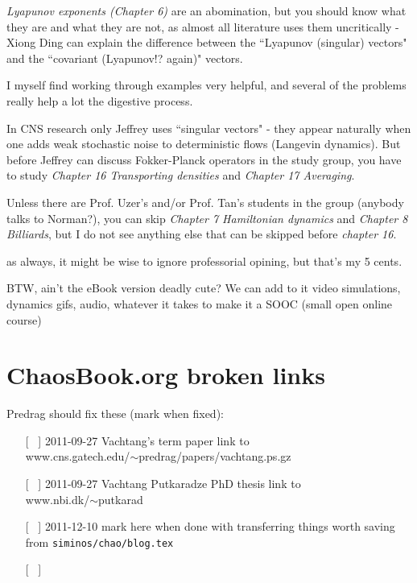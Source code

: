 \begin{description}
\emph{Lyapunov exponents (Chapter 6)} are an abomination, but you should
know what they are and what they are not, as almost  all literature
uses them uncritically - Xiong Ding can explain the difference
between the ``Lyapunov (singular) vectors" and the ``covariant
(Lyapunov!? again)" vectors.

I myself find working through examples very helpful, and several of
the problems really help a lot the digestive process.

In CNS research only Jeffrey uses ``singular vectors" - they appear
naturally when one adds weak stochastic noise to deterministic flows
(Langevin dynamics). But before Jeffrey  can discuss Fokker-Planck
operators in the study group, you have to study \emph{Chapter 16
Transporting densities} and \emph{Chapter 17 Averaging}.

Unless there are Prof. Uzer's and/or Prof. Tan's students in the
group (anybody talks to Norman?), you can skip \emph{Chapter 7 Hamiltonian
dynamics} and \emph{Chapter 8 Billiards}, but I do not see anything else that
can be skipped before \emph{chapter 16}.

as always, it might be wise to ignore professorial opining, but that's my 5 cents.

BTW, ain't the eBook version deadly cute? We can add to it video simulations, dynamics gifs, audio, whatever it takes to make it a SOOC (small open online course)

\end{description}

\section{ChaosBook.org broken links}
\label{c-brokenLinks}

Predrag should fix these (mark when fixed):
\begin{itemize}
  \item[[~]] 2011-09-27
{Vachtang's term paper} link to
\\
www.cns.gatech.edu/$\sim$predrag/papers/vachtang.ps.gz
  \item[[~]] 2011-09-27
{Vachtang Putkaradze PhD thesis} link to
\\
www.nbi.dk/$\sim$putkarad
  \item[[~]] 2011-12-10
mark here when done with transferring things worth saving from
\texttt{siminos/chao/blog.tex}
  \item[[~]]
\end{itemize}


